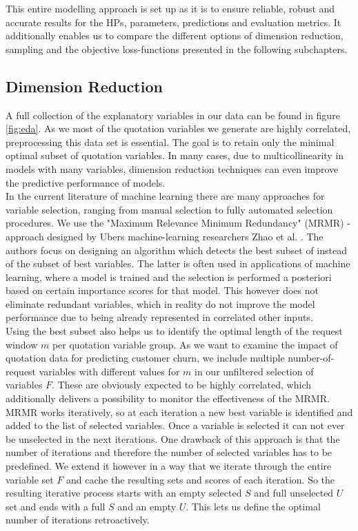 \documentclass[12pt,titlepage]{article}
\begin{document}
\noindent
This entire modelling approach is set up as it is to ensure reliable, robust and accurate results for the HPs, parameters, predictions and evaluation metrics. It additionally enables us to compare the different options of dimension reduction, sampling and the objective loss-functions presented in the following subchapters. \\

\subsection{Dimension Reduction} \par
\label{chap:mrmr}

A full collection of the explanatory variables in our data can be found in figure \ref{fig:eda}. As we most of the quotation variables we generate are highly correlated, preprocessing this data set is essential. The goal is to retain only the minimal optimal subset of quotation variables. In many cases, due to multicollinearity in models with many variables, dimension reduction techniques can even improve the predictive performance of models. \\
In the current literature of machine learning there are many approaches for variable selection, ranging from manual selection to fully automated selection procedures. We use the "Maximum Relevance Minimum Redundancy" (MRMR) - approach designed by Ubers machine-learning researchers Zhao et al. \cite{mrmr}. The authors focus on designing an algorithm which detects the best subset of instead of the subset of best variables. The latter is often used in applications of machine learning, where a model is trained and the selection is performed a posteriori based on certain importance scores for that model. This however does not eliminate redundant variables, which in reality do not improve the model performance due to being already represented in correlated other inputs. \\
Using the best subset also helps us to identify the optimal length of the request window $m$ per quotation variable group. As we want to examine the impact of quotation data for predicting customer churn, we include multiple number-of-request variables with different values for $m$ in our unfiltered selection of variables $F$. These are obviously expected to be highly correlated, which additionally delivers a possibility to monitor the effectiveness of the MRMR. \\
MRMR works iteratively, so at each iteration a new best variable is identified and added to the list of selected variables. Once a variable is selected it can not ever be unselected in the next iterations. One drawback of this approach is that the number of iterations and therefore the number of selected variables has to be predefined. We extend it however in a way that we iterate through the entire variable set $F$ and cache the resulting sets and scores of each iteration. So the resulting iterative process starts with an empty selected $S$ and full unselected $U$ set and ends with a full $S$ and an empty $U$. This lets us define the optimal number of iterations retroactively. \\
\end{document}
